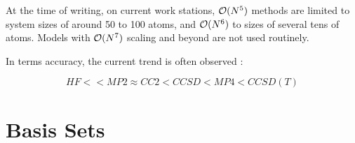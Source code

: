 At the time of writing, on current work stations, $\mathcal{O}(N^{5})$ methods are limited to system sizes of around 50 to 100 atoms, and $\mathcal{O}(N^{6})$ to sizes of several tens of atoms. Models with $\mathcal{O}(N^{7})$ scaling and beyond are not used routinely. 

In terms accuracy, the current trend is often observed \cite{Jen2017}:

\begin{equation}
HF << MP2 \approx CC2 < CCSD < MP4 < CCSD(T) 
\end{equation}

\section{Basis Sets \label{sec:BASISSETS}}